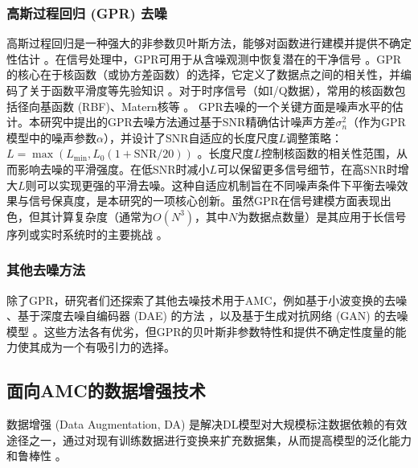 \documentclass[conference]{IEEEtran}
\begin{document}
\subsubsection{高斯过程回归 (GPR) 去噪}
高斯过程回归是一种强大的非参数贝叶斯方法，能够对函数进行建模并提供不确定性估计 \cite{[17]}\cite{[18]}\cite{[53]}。在信号处理中，GPR可用于从含噪观测中恢复潜在的干净信号 \cite{[54]}。GPR的核心在于核函数（或协方差函数）的选择，它定义了数据点之间的相关性，并编码了关于函数平滑度等先验知识 \cite{[17]}。对于时序信号（如I/Q数据），常用的核函数包括径向基函数 (RBF)、Matern核等 \cite{}。
GPR去噪的一个关键方面是噪声水平的估计。本研究中提出的GPR去噪方法通过基于SNR精确估计噪声方差$\sigma_n^2$（作为GPR模型中的噪声参数$\alpha$），并设计了SNR自适应的长度尺度$L$调整策略：$L = \max(L_{\min}, L_0(1+\mathrm{SNR}/20))$ \cite{}。长度尺度$L$控制核函数的相关性范围，从而影响去噪的平滑强度。在低SNR时减小$L$可以保留更多信号细节，在高SNR时增大$L$则可以实现更强的平滑去噪。这种自适应机制旨在不同噪声条件下平衡去噪效果与信号保真度，是本研究的一项核心创新。虽然GPR在信号建模方面表现出色，但其计算复杂度（通常为$O(N^3)$，其中$N$为数据点数量）是其应用于长信号序列或实时系统时的主要挑战 \cite{[17]}。

\subsubsection{其他去噪方法}
除了GPR，研究者们还探索了其他去噪技术用于AMC，例如基于小波变换的去噪 \cite{[55]}\cite{[56]}、基于深度去噪自编码器 (DAE) 的方法 \cite{[20]}，以及基于生成对抗网络 (GAN) 的去噪模型 \cite{[15]}\cite{[16]}。这些方法各有优劣，但GPR的贝叶斯非参数特性和提供不确定性度量的能力使其成为一个有吸引力的选择。

\subsection{面向AMC的数据增强技术}
数据增强 (Data Augmentation, DA) 是解决DL模型对大规模标注数据依赖的有效途径之一，通过对现有训练数据进行变换来扩充数据集，从而提高模型的泛化能力和鲁棒性 \cite{[5]}\cite{[19]}\cite{[49]}\cite{[51]}。
\end{document}
